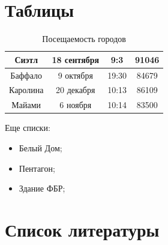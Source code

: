 \documentclass[a4paper,12pt]{article}
\begin{document}
	\section{Таблицы} 
	\label{s3}
	\begin{table}[h] 
		\label{t1}
		\begin{center}
			\begin{tabular}{|c|c|c|c|}
				\hline
				Сиэтл & 18 сентября & 9:3 & 91046\\
				\hline
				Баффало & 9 октября & 19:30 & 84679\\
				\hline
				Каролина & 20 декабря & 10:13 & 86109\\
				\hline
				Майами & 6 ноября & 10:14 & 83500\\
				\hline
			\end{tabular}
		\end{center}
		\caption{Посещаемость городов}
	\end{table}
	\newpage

	Еще списки:
	\begin{itemize}
		\item Белый Дом;
		\item Пентагон;
		\item Здание ФБР;
		\cite{posl}
	\end{itemize}
	\newpage
	
	\section{Список литературы}
	
\end{document}

